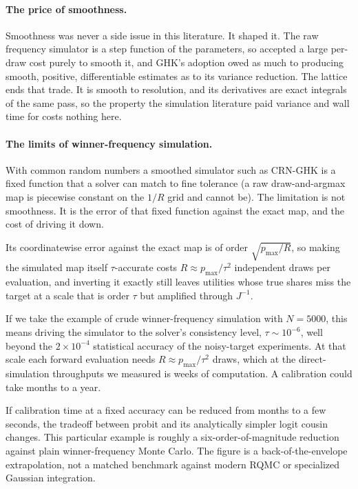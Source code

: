 \documentclass[12pt]{article}
\theoremstyle{remark}
\begin{document}
\paragraph{The price of smoothness.} Smoothness was never a side
issue in this literature. It shaped it. The raw frequency simulator is a
step function of the parameters, so \citet{stern1992} accepted a large
per-draw cost purely to smooth it, and GHK's adoption owed as much to
producing smooth, positive, differentiable estimates
\citep{hajivassiliou1998} as to its variance reduction. The lattice ends
that trade. It is smooth to resolution, and its derivatives are exact
integrals of the same pass, so the property the simulation literature
paid variance and wall time for costs nothing here.

\paragraph{The limits of winner-frequency simulation.} With common
random numbers a smoothed simulator such as CRN-GHK is a fixed function
that a solver can match to fine tolerance (a raw draw-and-argmax map is
piecewise constant on the $1/R$ grid and cannot be). The limitation is
not smoothness. It is the error of that fixed function against the
exact map, and the cost of driving it down.

Its coordinatewise error against the exact map is of order
$\sqrt{p_{\max}/R}$, so making the simulated map itself $\tau$-accurate
costs $R \approx p_{\max}/\tau^2$ independent draws per evaluation, and
inverting it exactly still leaves utilities whose true shares miss the
target at a scale that is order $\tau$ but amplified through $J^{-1}$.

If we take the example of crude winner-frequency simulation with $N = 5000$, this
means driving the simulator to the solver's consistency level, $\tau
\sim 10^{-6}$, well beyond the $2\times10^{-4}$ statistical accuracy of the
noisy-target experiments. At that scale each forward evaluation needs
$R \approx p_{\max}/\tau^2$ draws, which at the direct-simulation
throughputs we measured is weeks of computation. A calibration could
take months to a year. 

If calibration time at a fixed accuracy can be reduced from months to
a few seconds, the tradeoff between probit and its analytically simpler logit
cousin changes. This particular example is roughly a
six-order-of-magnitude reduction against plain winner-frequency Monte
Carlo. The figure is a back-of-the-envelope extrapolation, not a
matched benchmark against modern RQMC or specialized Gaussian
integration.
\end{document}
